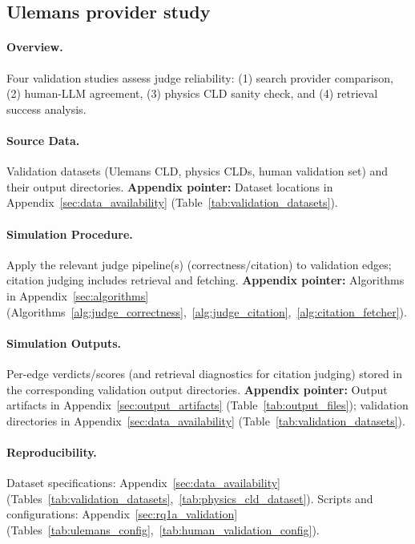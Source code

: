 \subsection{Ulemans provider study}
\label{sec:rq1a_validation_studies}

\paragraph{Overview.}
Four validation studies assess judge reliability: (1) search provider comparison, (2) human-LLM agreement, (3) physics CLD sanity check, and (4) retrieval success analysis.

\paragraph{Source Data.}
Validation datasets (Ulemans CLD, physics CLDs, human validation set) and their output directories.
\textbf{Appendix pointer:} Dataset locations in Appendix~\ref{sec:data_availability} (Table~\ref{tab:validation_datasets}).

\paragraph{Simulation Procedure.}
Apply the relevant judge pipeline(s) (correctness/citation) to validation edges; citation judging includes retrieval and fetching.
\textbf{Appendix pointer:} Algorithms in Appendix~\ref{sec:algorithms} (Algorithms~\ref{alg:judge_correctness},~\ref{alg:judge_citation},~\ref{alg:citation_fetcher}).

\paragraph{Simulation Outputs.}
Per-edge verdicts/scores (and retrieval diagnostics for citation judging) stored in the corresponding validation output directories.
\textbf{Appendix pointer:} Output artifacts in Appendix~\ref{sec:output_artifacts} (Table~\ref{tab:output_files}); validation directories in Appendix~\ref{sec:data_availability} (Table~\ref{tab:validation_datasets}).

\paragraph{Reproducibility.}
Dataset specifications: Appendix~\ref{sec:data_availability} (Tables~\ref{tab:validation_datasets},~\ref{tab:physics_cld_dataset}). Scripts and configurations: Appendix~\ref{sec:rq1a_validation} (Tables~\ref{tab:ulemans_config},~\ref{tab:human_validation_config}).

